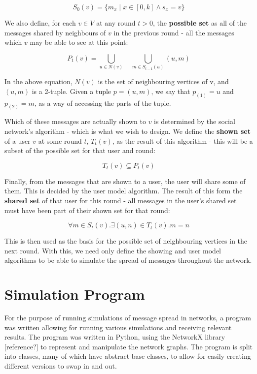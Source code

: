 \documentclass[bsc,frontabs,twoside,singlespacing,parskip,deptreport]{infthesis}     %
\begin{document}
\begin{equation}
S_{0}(v) = \{m_{x} \; | \; x \in [0, k] \wedge s_{x} = v\}
\end{equation}


We also define, for each $v \in V$ at any round $t > 0$, the \textbf{possible set} as all of the messages shared by neighbours of $v$ in the previous round - all the messages which $v$ may be able to see at this point:

\begin{equation}
P_{t}(v) = \bigcup_{u \in N(v)} \quad \bigcup_{m \in S_{t-1}(u)} (u, m)
\end{equation}

In the above equation, $N(v)$ is the set of neighbouring vertices of v, and $(u, m)$ is a 2-tuple. Given a tuple $p = (u, m)$, we say that $p_{(1)} = u$ and $p_{(2)} = m$, as a way of accessing the parts of the tuple.

Which of these messages are actually shown to $v$ is determined by the social network's algorithm - which is what we wish to design. We define the \textbf{shown set} of a user $v$ at some round $t$, $T_{t}(v)$, as the result of this algorithm - this will be a subset of the possible set for that user and round:

\begin{equation}
T_{t}(v) \subseteq P_{t}(v)
\end{equation}

Finally, from the messages that are shown to a user, the user will share some of them. This is decided by the user model algorithm. The result of this form the \textbf{shared set} of that user for this round - all messages in the user's shared set must have been part of their shown set for that round:

\begin{equation}
\forall m \in S_{t}(v) . \exists (u, n) \in T_{t}(v) . m = n
\end{equation}

This is then used as the basis for the possible set of neighbouring vertices in the next round. With this, we need only define the showing and user model algorithms to be able to simulate the spread of messages throughout the network.

\section{Simulation Program}
For the purpose of running simulations of message spread in networks, a program was written allowing for running various simulations and receiving relevant results. The program was written in Python, using the NetworkX library [reference?] to represent and manipulate the network graphs. The program is split into classes, many of which have abstract base classes, to allow for easily creating different versions to swap in and out.
\end{document}
